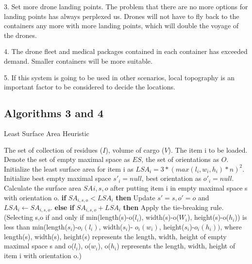 \documentclass{mcmthesis}
\begin{document}
3.	Set more drone landing points. The problem that there are no more options for landing points has always perplexed us. Drones will not have to fly back to the containers any more with more landing points, which will double the voyage of the drones.

4.	The drone fleet and medical packages contained in each container has exceeded demand. Smaller containers will be more suitable.
 
5.	If this system is going to be used in other scenarios, local topography is an important factor to be considered to decide the locations.

\newpage
    \begin{appendices}
    	\section{Algorithms 3 and 4}
    	    \begin{algorithm}
    		\label{al2}
    		\renewcommand{\algorithmicrequire}{\textbf{Input:}}
    		\renewcommand{\algorithmicensure}{\textbf{Output: }}
    		\caption{Least Surface Area Heuristic}
    		\begin{algorithmic}[2]
    			\REQUIRE  The set of collection of residues ($I$), volume of cargo ($V$).
    			\ENSURE The item i to be loaded.
    			\STATE  Denote the set of empty maximal space as $ES$, the set of orientations as $O$. 
    			\STATE Initialize the least surface area for item i as $LSA_i=3*(max(l_i,w_i,h_i)*n)^2$.
    			\STATE Initialize best empty maximal space $s'_i=null$, best orientation as $o'_i = null$. 
    			\STATE Calculate the surface area  $SA_{}i,s,o$  after putting item i in empty maximal space s with orientation o. 
    			\STATE   \textbf{if} $SA_{i,s,o} < LSA_i$ \textbf{then}
    			\STATE   Update $s'=s, o'=o$ and $LSA_i\leftarrow SA_{i,s,o}$.
    			\STATE \textbf{else if} $SA_{i,s,o}+LSA_i$ \textbf{then}
    			\STATE  Apply the tie-breaking rule. (Selecting s,o if and only if min(length(s)-o($l_i$), width(s)-o($W_i$), height(s)-o($h_i$)) is less than min(length($s_i$)-$o_i(l_i)$, width($s_i$)- $o_i(w_i)$, height($s_i$)-$o_i(h_i))$, where length(s), width(s), height(s) represents the length, width, height of empty maximal space s and o($l_i$), o($w_i$), o($h_i$) represents the length, width, height of item i with orientation o.) 
    			

\end{algorithmic}
\end{algorithm}
\end{appendices}
\end{document}
